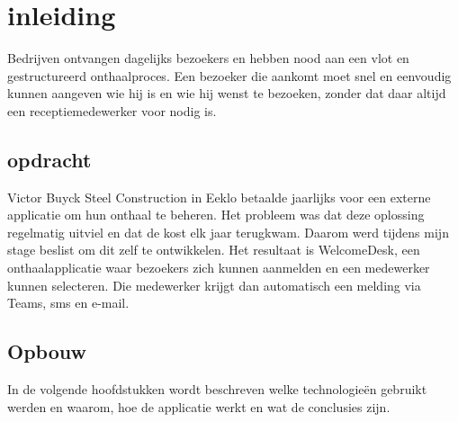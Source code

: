
\chapter{inleiding}

Bedrijven ontvangen dagelijks bezoekers en hebben nood aan een vlot en 
gestructureerd onthaalproces. Een bezoeker die aankomt moet snel en eenvoudig 
kunnen aangeven wie hij is en wie hij wenst te bezoeken, zonder dat daar 
altijd een receptiemedewerker voor nodig is.

\section{opdracht}

Victor Buyck Steel Construction in Eeklo betaalde jaarlijks voor een 
externe applicatie om hun onthaal te beheren. Het probleem was dat deze 
oplossing regelmatig uitviel en dat de kost elk jaar terugkwam. Daarom 
werd tijdens mijn stage beslist om dit zelf te ontwikkelen.
\bigskip
Het resultaat is WelcomeDesk, een onthaalapplicatie waar bezoekers zich 
kunnen aanmelden en een medewerker kunnen selecteren. Die medewerker 
krijgt dan automatisch een melding via Teams, sms en e-mail.

\section{Opbouw}

In de volgende hoofdstukken wordt beschreven welke technologieën gebruikt 
werden en waarom, hoe de applicatie werkt en wat de conclusies zijn.
